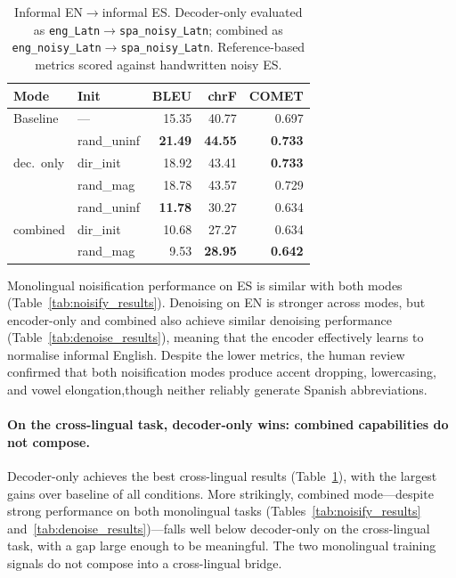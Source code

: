 \documentclass[11pt]{article}
\begin{document}
\begin{table}[t]
  \centering
  \small
  \begin{tabular}{llrrr}
    \toprule
    \textbf{Mode} & \textbf{Init} & \textbf{BLEU} & \textbf{chrF} & \textbf{COMET} \\
    \midrule
    Baseline & --- & 15.35 & 40.77 & 0.697 \\
    \midrule
    \multirow{3}{*}{dec.\ only}
      & rand\_uninf & \textbf{21.49} & \textbf{44.55} & \textbf{0.733} \\
      & dir\_init   & 18.92 & 43.41 & \textbf{0.733} \\
      & rand\_mag   & 18.78 & 43.57 & 0.729 \\
    \midrule
    \multirow{3}{*}{combined}
      & rand\_uninf & \textbf{11.78} & 30.27 & 0.634 \\
      & dir\_init   & 10.68 & 27.27 & 0.634 \\
      & rand\_mag   &  9.53 & \textbf{28.95} & \textbf{0.642} \\
    \bottomrule
  \end{tabular}
  \caption{Informal EN$\rightarrow$informal ES. Decoder-only
    evaluated as \texttt{eng\_Latn}$\rightarrow$\texttt{spa\_noisy\_Latn};
    combined as
    \texttt{eng\_noisy\_Latn}$\rightarrow$\texttt{spa\_noisy\_Latn}.
    Reference-based metrics scored against handwritten noisy ES.}
  \label{tab:primary_results}
\end{table}

Monolingual noisification performance on ES is similar with both modes
(Table~\ref{tab:noisify_results}). Denoising on EN is stronger across modes, but encoder-only and combined also achieve similar denoising performance
(Table~\ref{tab:denoise_results}), meaning that the encoder effectively learns to normalise informal English. Despite the lower metrics, the human review confirmed that both noisification modes produce accent dropping, lowercasing, and vowel elongation,though neither reliably generate Spanish abbreviations.

\paragraph{On the cross-lingual task, decoder-only wins: combined capabilities do not compose.}
Decoder-only achieves the best cross-lingual results
(Table~\ref{tab:primary_results}), with the largest gains over baseline of all
conditions. More strikingly, combined mode---despite strong performance on both
monolingual tasks (Tables~\ref{tab:noisify_results}
and~\ref{tab:denoise_results})---falls well below decoder-only on the
cross-lingual task, with a gap large enough to be meaningful. The two monolingual training signals do not compose into a
cross-lingual bridge.
\end{document}
